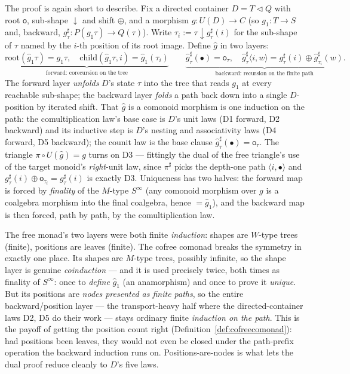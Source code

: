 \documentclass[11pt,a4paper]{book}
\newcommand{\cont}[2]{#1 \triangleleft #2}
\theoremstyle{plain}
\theoremstyle{definition}
\theoremstyle{remark}
\begin{document}
The proof is again short to describe. Fix a directed container $D=\cont TQ$ with root
$\mathsf o$, sub-shape ${\downarrow}$ and shift $\oplus$, and a morphism $g\colon U(D)\to C$
(so $g_{1}\colon T\to S$ and, backward, $g^{\sharp}_{\tau}\colon P(g_{1}\tau)\to Q(\tau)$). Write
$\tau_{i}:=\tau\downarrow g^{\sharp}_{\tau}(i)$ for the sub-shape of $\tau$ named by the $i$-th
position of its root image. Define $\widehat g$ in two layers:
\[
  \underbrace{\mathrm{root}(\widehat g_{1}\tau)=g_{1}\tau,\quad
    \mathrm{child}(\widehat g_{1}\tau,i)=\widehat g_{1}(\tau_{i})}_{\text{forward: corecursion on the tree}}
  \qquad
  \underbrace{\widehat g^{\sharp}_{\tau}(\bullet)=\mathsf o_{\tau},\quad
    \widehat g^{\sharp}_{\tau}\langle i,w\rangle
      =g^{\sharp}_{\tau}(i)\oplus\widehat g^{\sharp}_{\tau_{i}}(w)}_{\text{backward: recursion on the finite path}}.
\]
The forward layer \emph{unfolds} $D$'s state $\tau$ into the tree that reads $g_{1}$ at every
reachable sub-shape; the backward layer \emph{folds} a path back down into a single $D$-position
by iterated shift. That $\widehat g$ is a comonoid morphism is one induction on the path: the
comultiplication law's base case is $D$'s unit laws (D1 forward, D2 backward) and its inductive
step is $D$'s nesting and associativity laws (D4 forward, D5 backward); the counit law is the
base clause $\widehat g^{\sharp}_{\tau}(\bullet)=\mathsf o_{\tau}$. The triangle
$\pi\circ U(\widehat g)=g$ turns on D3 --- fittingly the dual of the free triangle's use of the
target monoid's \emph{right}-unit law, since $\pi^{\sharp}$ picks the depth-one path
$\langle i,\bullet\rangle$ and $g^{\sharp}_{\tau}(i)\oplus\mathsf o_{\tau_{i}}=g^{\sharp}_{\tau}(i)$
is exactly D3. Uniqueness has two halves: the forward map is forced by \emph{finality} of the
$M$-type $S^{\infty}$ (any comonoid morphism over $g$ is a coalgebra morphism into the final
coalgebra, hence $=\widehat g_{1}$), and the backward map is then forced, path by path, by the
comultiplication law.

\begin{teachbox}
The free monad's two layers were both finite \emph{induction}: shapes are $W$-type trees
(finite), positions are leaves (finite). The cofree comonad breaks the symmetry in exactly one
place. Its shapes are $M$-type trees, possibly infinite, so the shape layer is genuine
\emph{coinduction} --- and it is used precisely twice, both times as finality of $S^{\infty}$:
once to \emph{define} $\widehat g_{1}$ (an anamorphism) and once to prove it \emph{unique}. But
its positions are \emph{nodes presented as finite paths}, so the entire backward/position layer
--- the transport-heavy half where the directed-container laws D2, D5 do their work --- stays
ordinary finite \emph{induction on the path}. This is the payoff of getting the position count
right (Definition~\ref{def:cofreecomonad}): had positions been leaves, they would not even be
closed under the path-prefix operation the backward induction runs on. Positions-are-nodes is
what lets the dual proof reduce cleanly to $D$'s five laws.
\end{teachbox}
\end{document}
